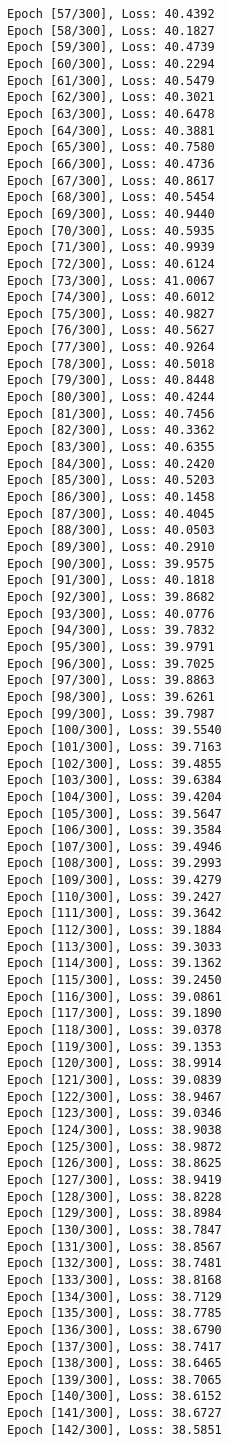 \documentclass[11pt]{article}
\begin{document}
\begin{Verbatim}[commandchars=\\\{\}]
Epoch [57/300], Loss: 40.4392
Epoch [58/300], Loss: 40.1827
Epoch [59/300], Loss: 40.4739
Epoch [60/300], Loss: 40.2294
Epoch [61/300], Loss: 40.5479
Epoch [62/300], Loss: 40.3021
Epoch [63/300], Loss: 40.6478
Epoch [64/300], Loss: 40.3881
Epoch [65/300], Loss: 40.7580
Epoch [66/300], Loss: 40.4736
Epoch [67/300], Loss: 40.8617
Epoch [68/300], Loss: 40.5454
Epoch [69/300], Loss: 40.9440
Epoch [70/300], Loss: 40.5935
Epoch [71/300], Loss: 40.9939
Epoch [72/300], Loss: 40.6124
Epoch [73/300], Loss: 41.0067
Epoch [74/300], Loss: 40.6012
Epoch [75/300], Loss: 40.9827
Epoch [76/300], Loss: 40.5627
Epoch [77/300], Loss: 40.9264
Epoch [78/300], Loss: 40.5018
Epoch [79/300], Loss: 40.8448
Epoch [80/300], Loss: 40.4244
Epoch [81/300], Loss: 40.7456
Epoch [82/300], Loss: 40.3362
Epoch [83/300], Loss: 40.6355
Epoch [84/300], Loss: 40.2420
Epoch [85/300], Loss: 40.5203
Epoch [86/300], Loss: 40.1458
Epoch [87/300], Loss: 40.4045
Epoch [88/300], Loss: 40.0503
Epoch [89/300], Loss: 40.2910
Epoch [90/300], Loss: 39.9575
Epoch [91/300], Loss: 40.1818
Epoch [92/300], Loss: 39.8682
Epoch [93/300], Loss: 40.0776
Epoch [94/300], Loss: 39.7832
Epoch [95/300], Loss: 39.9791
Epoch [96/300], Loss: 39.7025
Epoch [97/300], Loss: 39.8863
Epoch [98/300], Loss: 39.6261
Epoch [99/300], Loss: 39.7987
Epoch [100/300], Loss: 39.5540
Epoch [101/300], Loss: 39.7163
Epoch [102/300], Loss: 39.4855
Epoch [103/300], Loss: 39.6384
Epoch [104/300], Loss: 39.4204
Epoch [105/300], Loss: 39.5647
Epoch [106/300], Loss: 39.3584
Epoch [107/300], Loss: 39.4946
Epoch [108/300], Loss: 39.2993
Epoch [109/300], Loss: 39.4279
Epoch [110/300], Loss: 39.2427
Epoch [111/300], Loss: 39.3642
Epoch [112/300], Loss: 39.1884
Epoch [113/300], Loss: 39.3033
Epoch [114/300], Loss: 39.1362
Epoch [115/300], Loss: 39.2450
Epoch [116/300], Loss: 39.0861
Epoch [117/300], Loss: 39.1890
Epoch [118/300], Loss: 39.0378
Epoch [119/300], Loss: 39.1353
Epoch [120/300], Loss: 38.9914
Epoch [121/300], Loss: 39.0839
Epoch [122/300], Loss: 38.9467
Epoch [123/300], Loss: 39.0346
Epoch [124/300], Loss: 38.9038
Epoch [125/300], Loss: 38.9872
Epoch [126/300], Loss: 38.8625
Epoch [127/300], Loss: 38.9419
Epoch [128/300], Loss: 38.8228
Epoch [129/300], Loss: 38.8984
Epoch [130/300], Loss: 38.7847
Epoch [131/300], Loss: 38.8567
Epoch [132/300], Loss: 38.7481
Epoch [133/300], Loss: 38.8168
Epoch [134/300], Loss: 38.7129
Epoch [135/300], Loss: 38.7785
Epoch [136/300], Loss: 38.6790
Epoch [137/300], Loss: 38.7417
Epoch [138/300], Loss: 38.6465
Epoch [139/300], Loss: 38.7065
Epoch [140/300], Loss: 38.6152
Epoch [141/300], Loss: 38.6727
Epoch [142/300], Loss: 38.5851

\end{Verbatim}
\end{document}
